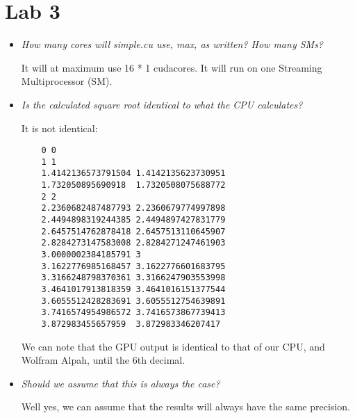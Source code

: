 \documentclass[a4paper,12pt]{article}
\begin{document}
\section{Lab 3}


\begin{itemize}
\item \textit{How many cores will simple.cu use, max, as written? How many SMs?}

  It will at maximum use 16 * 1 cudacores. It will run on one Streaming Multiprocessor (SM).

\item \textit{Is the calculated square root identical to what the CPU calculates?}

  It is not identical:

  \begin{lstlisting}
    0 0
    1 1
    1.4142136573791504 1.4142135623730951
    1.732050895690918  1.7320508075688772
    2 2
    2.2360682487487793 2.2360679774997898
    2.4494898319244385 2.4494897427831779
    2.6457514762878418 2.6457513110645907
    2.8284273147583008 2.8284271247461903
    3.0000002384185791 3
    3.1622776985168457 3.1622776601683795
    3.3166248798370361 3.3166247903553998
    3.4641017913818359 3.4641016151377544
    3.6055512428283691 3.6055512754639891
    3.7416574954986572 3.7416573867739413
    3.872983455657959  3.872983346207417
  \end{lstlisting}

  We can note that the GPU output is identical to that of our CPU, and Wolfram Alpah, until the 6th decimal.

\item \textit{Should we assume that this is always the case?}

  Well yes, we can assume that the results will always have the same precision.

\end{itemize}
\end{document}
